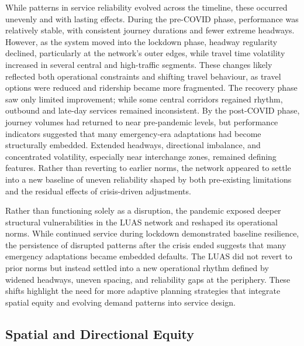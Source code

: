     While patterns in service reliability evolved across the timeline, these occurred unevenly and with lasting effects. During the pre-COVID phase, performance was relatively stable, with consistent journey durations and fewer extreme headways. However, as the system moved into the lockdown phase, headway regularity declined, particularly at the network’s outer edges, while travel time volatility increased in several central and high-traffic segments. These changes likely reflected both operational constraints and shifting travel behaviour, as travel options were reduced and ridership became more fragmented. The recovery phase saw only limited improvement; while some central corridors regained rhythm, outbound and late-day services remained inconsistent. By the post-COVID phase, journey volumes had returned to near pre-pandemic levels, but performance indicators suggested that many emergency-era adaptations had become structurally embedded. Extended headways, directional imbalance, and concentrated volatility, especially near interchange zones, remained defining features. Rather than reverting to earlier norms, the network appeared to settle into a new baseline of uneven reliability shaped by both pre-existing limitations and the residual effects of crisis-driven adjustments.

    Rather than functioning solely as a disruption, the pandemic exposed deeper structural vulnerabilities in the LUAS network and reshaped its operational norms. While continued service during lockdown demonstrated baseline resilience, the persistence of disrupted patterns after the crisis ended suggests that many emergency adaptations became embedded defaults. The LUAS did not revert to prior norms but instead settled into a new operational rhythm defined by widened headways, uneven spacing, and reliability gaps at the periphery. These shifts highlight the need for more adaptive planning strategies that integrate spatial equity and evolving demand patterns into service design.

\subsection*{Spatial and Directional Equity}

